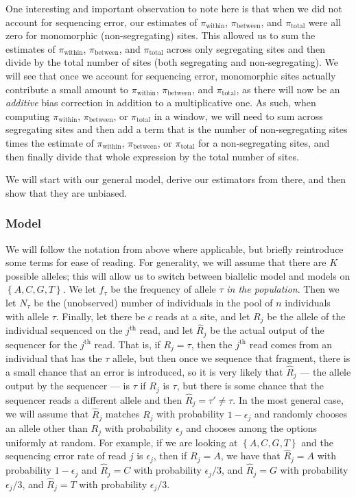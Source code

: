 \documentclass[letterpaper,fontsize=9pt,DIV=12]{scrartcl}
\newcommand*{\piw}{$\pi_\text{within}$\xspace}
\newcommand*{\pib}{$\pi_\text{between}$\xspace}
\newcommand*{\pit}{$\pi_\text{total}$\xspace}
\begin{document}
One interesting and important observation to note here is that when we did not account for sequencing error, our estimates of \piw, \pib, and \pit were all zero for monomorphic (non-segregating) sites.  This allowed us to sum the estimates of \piw, \pib, and \pit across only segregating sites and then divide by the total number of sites (both segregating and non-segregating).  We will see that once we account for sequencing error, monomorphic sites actually contribute a small amount to \piw, \pib, and \pit, as there will now be an \emph{additive} bias correction in addition to a multiplicative one.  As such, when computing \piw, \pib, or \pit in a window, we will need to sum across segregating sites and then add a term that is the number of non-segregating sites times the estimate of \piw, \pib, or \pit for a non-segregating sites, and then finally divide that whole expression by the total number of sites.

We will start with our general model, derive our estimators from there, and then show that they are unbiased.  


\subsubsection*{Model}
\label{supp:sec:FST:sub:HeterozygositySequencingError:sub:Model}

We will follow the notation from above where applicable, but briefly reintroduce some terms for ease of reading.  For generality, we will assume that there are $K$ possible alleles; this will allow us to switch between biallelic model and models on $\left\{A, C, G, T\right\}$.  We let $f_\tau$ be the frequency of allele $\tau$ \emph{in the population}.  Then we let $N_\tau$ be the (unobserved) number of individuals in the pool of $n$ individuals with allele $\tau$.  Finally, let there be $c$ reads at a site, and let $R_j$ be the allele of the individual sequenced on the $j^\text{th}$ read, and let $\hat{R}_j$ be the actual output of the sequencer for the $j^\text{th}$ read.  That is, if $R_j = \tau$, then the $j^\text{th}$ read comes from an individual that has the $\tau$ allele, but then once we sequence that fragment, there is a small chance that an error is introduced, so it is very likely that $\hat{R}_j$ --- the allele output by the sequencer --- is $\tau$ if $R_j$ is $\tau$, but there is some chance that the sequencer reads a different allele and then $\hat{R}_j = \tau' \ne \tau$.  In the most general case, we will assume that $\hat{R}_j$ matches $R_j$ with probability $1 - \epsilon_j$ and randomly chooses an allele other than $R_j$ with probability $\epsilon_j$ and chooses among the options uniformly at random.  For example, if we are looking at  $\left\{A, C, G, T\right\}$ and the sequencing error rate of read $j$ is $\epsilon_j$, then if $R_j = A$, we have that $\hat{R}_j = A$ with probability $1 - \epsilon_j$ and $\hat{R}_j = C$ with probability $\epsilon_j/3$, and $\hat{R}_j = G$ with probability $\epsilon_j/3$, and $\hat{R}_j = T$ with probability $\epsilon_j/3$.
\end{document}

